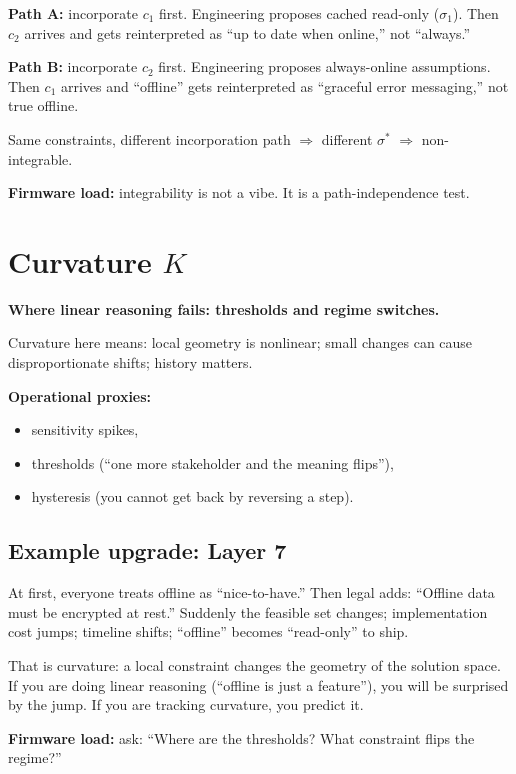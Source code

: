 \documentclass[11pt]{article}
\begin{document}
\textbf{Path A:} incorporate $c_1$ first. Engineering proposes cached read-only ($\sigma_1$). Then $c_2$ arrives and gets reinterpreted as ``up to date when online,'' not ``always.''

\textbf{Path B:} incorporate $c_2$ first. Engineering proposes always-online assumptions. Then $c_1$ arrives and ``offline'' gets reinterpreted as ``graceful error messaging,'' not true offline.

Same constraints, different incorporation path $\Rightarrow$ different $\sigma^*$ $\Rightarrow$ non-integrable.

\textbf{Firmware load:} integrability is not a vibe. It is a path-independence test.

\section{Curvature $K$}

\textbf{Where linear reasoning fails: thresholds and regime switches.}

Curvature here means: local geometry is nonlinear; small changes can cause disproportionate shifts; history matters.

\textbf{Operational proxies:}
\begin{itemize}[leftmargin=2em]
  \item sensitivity spikes,
  \item thresholds (``one more stakeholder and the meaning flips''),
  \item hysteresis (you cannot get back by reversing a step).
\end{itemize}

\subsection{Example upgrade: Layer 7}

At first, everyone treats offline as ``nice-to-have.'' Then legal adds: ``Offline data must be encrypted at rest.'' Suddenly the feasible set changes; implementation cost jumps; timeline shifts; ``offline'' becomes ``read-only'' to ship.

That is curvature: a local constraint changes the geometry of the solution space. If you are doing linear reasoning (``offline is just a feature''), you will be surprised by the jump. If you are tracking curvature, you predict it.

\textbf{Firmware load:} ask: ``Where are the thresholds? What constraint flips the regime?''
\end{document}
